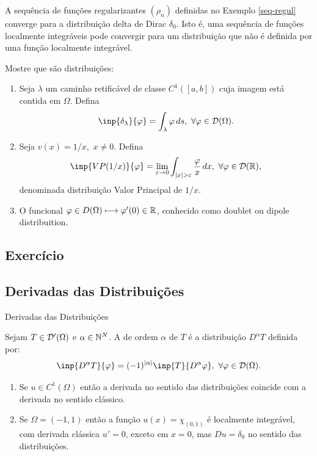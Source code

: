 \begin{frame}
	\begin{exe}
A sequência de funções regularizantes $(\rho_n)$ definidas no Exemplo \ref{seq-regul} converge para a distribuição delta de Dirac $\delta_{0}$. Isto é, uma sequência de funções localmente integráveis pode convergir para um distribuição que não é definida por uma função localmente integrável.
	\end{exe}
\end{frame}

\begin{frame}
	\begin{exer}
		Mostre que são distribuições:
\begin{enumerate}
	\item Seja $\lambda $ um caminho retificável de classe $C^1([a,b])$ cuja imagem está contida em $\Omega$. Defina
	\[\inp{\delta_\lambda}{\varphi}=\int_\lambda \varphi\, ds,\ \forall \varphi\in \D(\Omega).\]
	
	\item Seja $v(x)=1/x,$ $x\neq 0$. Defina
	\[\inp{VP(1/x)}{\varphi}=\lim\limits_{\ep\to 0}\int_{|x|>\ep}\frac{\varphi}{x}\,dx, \ \forall \varphi\in \D(\R),\]
	denominada distribuição Valor Principal de $1/x$.
	
	\item O funcional $\varphi \in D(\Omega) \longmapsto \varphi'(0)\in \mathbb{R}$, conhecido como doublet ou dipole distribuition.
\end{enumerate}
	\end{exer}
\subsection*{Exercício \theexer}
\end{frame}




\subsection*{Derivadas das Distribuições}
\begin{frame}{Derivadas das Distribuições}
\begin{defin}
	Sejam $T\in \mathcal{D}'(\Omega)$ e $\alpha\in \mathbb{N}^N$. A  de ordem $\alpha$ de $T$ é a distribuição $D^\alpha T$ definida por:
	\[\inp{D^\alpha T}{\varphi}=(-1)^{|\alpha|}\inp{T}{D^\alpha \varphi},\ \forall \varphi \in \D(\Omega).\]
\end{defin}

\begin{exe}
	\begin{enumerate}[a]
		\item Se $u\in C^1(\Omega)$ então a derivada no sentido das distribuições coincide com a derivada no sentido clássico.
		
		\item Se $\Omega=(-1,1)$ então a função  
		$u(x)=\chi_{(0,1)}$ é localmente integrável, com derivada clássica $u'=0$, exceto em $x=0$, mas $Du=\delta_0$ no sentido das distribuições.
		
	\end{enumerate}
\end{exe}
\end{frame}

